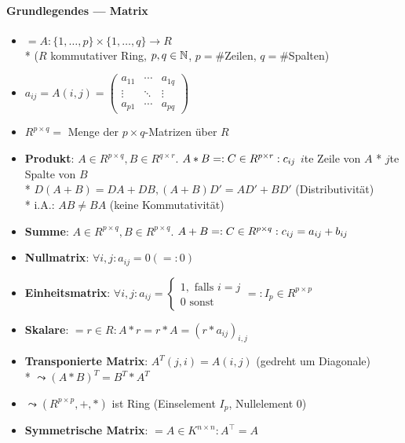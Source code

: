\paragraph{Grundlegendes --- Matrix}
\begin{itemize}
  \item $=A:\{ 1,\dots,p \} \times \{ 1,\dots,q \} \rightarrow R$ \\* ($R$ kommutativer Ring, $p,q \in \mathbb{N}$, $p=\#$Zeilen, $q=\#$Spalten)
  \item $a_{ij}=A(i,j)=\begin{pmatrix} a_{11} & \cdots & a_{1q} \\ \vdots & \ddots & \vdots \\ a_{p1} & \cdots & a_{pq} \end{pmatrix}$
  \item $R^{p \times q} =$ Menge der $p \times q$-Matrizen über $R$
  \item \textbf{Produkt}: $A \in R^{p \times q}, B \in R^{q \times r}$. $A*B=:C \in R^{p \times r}: \\* c_{ij}$ $i$te Zeile von $A$ * $j$te Spalte von $B$ \\* $D(A+B)=DA+DB, (A+B)D' = AD'+BD'$ (Distributivität) \\* i.A.: $AB \neq BA$ (keine Kommutativität)
  \item \textbf{Summe}: $A \in R^{p \times q}, B \in R^{p \times q}$. $A+B=:C \in R^{p \times q}: \\* c_{ij} = a_{ij}+b_{ij}$
  \item \textbf{Nullmatrix}: $\forall i,j: a_{ij}=0 (=: 0)$
  \item \textbf{Einheitsmatrix}: $\forall i,j: a_{ij}=\begin{cases} 1, \text{ falls } i=j \\ 0 \text{ sonst} \end{cases}=: I_p \in R^{p \times p}$
  \item \textbf{Skalare}: $=r \in R: A*r=r*A=(r*a_{ij})_{i,j}$
  \item \textbf{Transponierte Matrix}: $A^{T}(j,i)=A(i,j)$ (gedreht um Diagonale) \\* $\leadsto (A*B)^T=B^T*A^T$
  \item $\leadsto (R^{p \times p},+,*)$ ist Ring (Einselement $I_p$, Nullelement $0$)
  \item \textbf{Symmetrische Matrix}: \( = A \in K^{n \times n}: A^\top  = A \)
\end{itemize}

